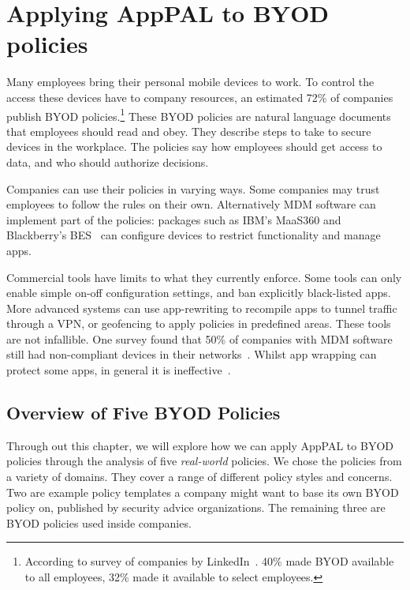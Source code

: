 \documentclass[thesis.tex]{subfiles}
\begin{document}
\chapter{Applying AppPAL to BYOD policies}
\label{chap:byod}

Many employees bring their personal mobile devices to work. To control
the access these devices have to company resources, an estimated 72\%
of companies publish \ac{BYOD} policies.\footnote{According to survey
  of companies by LinkedIn~\cite{schulze_byod_2016}. 40\% made \ac{BYOD}
  available to all employees, 32\% made it available to select
  employees.} These \ac{BYOD} policies are natural language documents
that employees should read and obey. They describe steps to take to
secure devices in the workplace. The policies say how employees should
get access to data, and who should authorize decisions.

Companies can use their policies in varying ways. Some companies may
trust employees to follow the rules on their own. Alternatively
\ac{MDM} software can implement part of the policies: packages such as
IBM's MaaS360 and Blackberry's BES~\cite{ibm_ibm_nodate,blackberry_secure_nodate} can
configure devices to restrict functionality and manage apps.

Commercial tools have limits to what they currently enforce. Some
tools can only enable simple on-off configuration settings, and ban
explicitly black-listed apps. More advanced systems can use
app-rewriting to recompile apps to tunnel traffic through a VPN, or
geofencing to apply policies in predefined areas. These tools are not
infallible. One survey found that 50\% of companies with \ac{MDM}
software still had non-compliant devices in their
networks~\cite{mobileiron_security_labs_q4_2015}. Whilst app wrapping
can protect some apps, in general it is
ineffective~\cite{hao_effectiveness_2013}.

\section{Overview of Five BYOD Policies}
\label{sec:overview-of-five-byod-policies}

Through out this chapter, we will explore how we can apply AppPAL to
BYOD policies through the analysis of five \emph{real-world} policies.
We chose the policies from a variety of domains.  They cover a range
of different policy styles and concerns.  Two are example policy
templates a company might want to base its own BYOD policy on,
published by security advice organizations.  The remaining three are
BYOD policies used inside companies.
\end{document}
